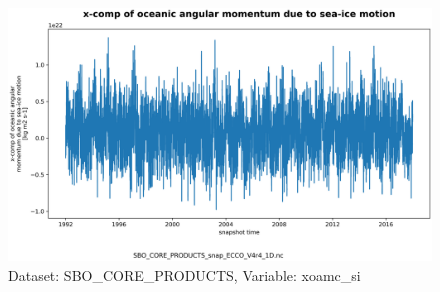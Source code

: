 \begin{figure}[H]
\centering
\includegraphics[scale=0.55]{../images/plots/v4r4/oneD_plots/SBO_Core_Products/xoamc_si.png}
\caption{Dataset: SBO\_CORE\_PRODUCTS, Variable: xoamc\_si}
\label{tab:table-SBO_CORE_PRODUCTS_xoamc_si-Plot}
\end{figure}
\newpage
\pagebreak
